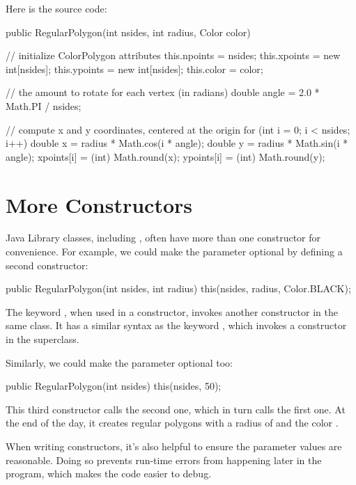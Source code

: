 Here is the source code:

\begin{code}
public RegularPolygon(int nsides, int radius, Color color) {

    // initialize ColorPolygon attributes
    this.npoints = nsides;
    this.xpoints = new int[nsides];
    this.ypoints = new int[nsides];
    this.color = color;

    // the amount to rotate for each vertex (in radians)
    double angle = 2.0 * Math.PI / nsides;

    // compute x and y coordinates, centered at the origin
    for (int i = 0; i < nsides; i++) {
        double x = radius * Math.cos(i * angle);
        double y = radius * Math.sin(i * angle);
        xpoints[i] = (int) Math.round(x);
        ypoints[i] = (int) Math.round(y);
    }
}
\end{code}



\section{More Constructors}

Java Library classes, including , often have more than one constructor for convenience.
For example, we could make the  parameter optional by defining a second constructor:

\begin{code}
public RegularPolygon(int nsides, int radius) {
    this(nsides, radius, Color.BLACK);
}
\end{code}

The keyword , when used in a constructor, invokes another constructor in the same class.
It has a similar syntax as the keyword , which invokes a constructor in the superclass.

Similarly, we could make the  parameter optional too:

\begin{code}
public RegularPolygon(int nsides) {
    this(nsides, 50);
}
\end{code}

This third constructor calls the second one, which in turn calls the first one.
At the end of the day, it creates regular polygons with a radius of  and the color .

When writing constructors, it's also helpful to ensure the parameter values are reasonable.
Doing so prevents run-time errors from happening later in the program, which makes the code easier to debug.

